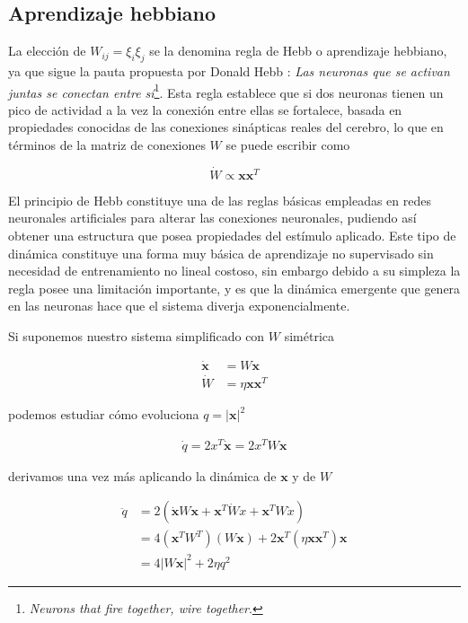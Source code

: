 \documentclass[11pt,a4paper,twoside,pdf]{article}
\numberwithin{equation}{section}
\begin{document}
\subsection{Aprendizaje hebbiano}
La elección de \(W_{ij} = \xi_i \xi_j\) se la denomina regla de Hebb o aprendizaje hebbiano, ya que sigue la pauta propuesta por Donald Hebb \parencite{hebb1974}: \emph{Las neuronas que se activan juntas se conectan entre sí}\footnote{\emph{Neurons that fire together, wire together}.}. Esta regla establece que si dos neuronas tienen un pico de actividad a la vez la conexión entre ellas se fortalece, basada en propiedades conocidas de las conexiones sinápticas reales del cerebro, lo que en términos de la matriz de conexiones \(W\) se puede escribir como

\begin{equation}
  \dot{W} \propto \mathbf{xx}^T
\end{equation}

El principio de Hebb constituye una de las reglas básicas empleadas en redes neuronales artificiales para alterar las conexiones neuronales, pudiendo así obtener una estructura que posea propiedades del estímulo aplicado. Este tipo de dinámica constituye una forma muy básica de aprendizaje no supervisado sin necesidad de entrenamiento no lineal costoso, sin embargo debido a su simpleza la regla posee una limitación importante, y es que la dinámica emergente que genera en las neuronas hace que el sistema diverja exponencialmente.

Si suponemos nuestro sistema simplificado con \(W\) simétrica

\begin{align}
  \dot{\mathbf{x}} &= W\mathbf{x}\\
  \dot{W} &= \eta \mathbf{xx}^T
\end{align}

podemos estudiar cómo evoluciona \(q = |\mathbf{x}|^2\)

\begin{align}
  \dot{q} = 2x^T\dot{\mathbf{x}} = 2x^TW\mathbf{x}
\end{align}

derivamos una vez más aplicando la dinámica de \(\mathbf{x}\) y de \(W\)

\begin{align}
  \ddot{q} &= 2(\dot{\mathbf{x}}W\mathbf{x} + \mathbf{x}^T\dot{W}x + \mathbf{x}^TW\dot{x})\\
   &= 4(\mathbf{x}^TW^T)(W\mathbf{x}) + 2\mathbf{x}^T(\eta \mathbf{xx}^T)\mathbf{x}\\
   &= 4|W\mathbf{x}|^2+2\eta q^2
\end{align}
\end{document}
